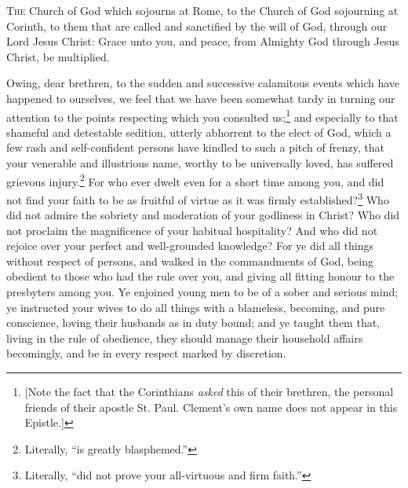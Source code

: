 

\textsc{The} Church of God which sojourns at Rome, to the Church of God sojourning at Corinth, to them that are called and sanctified by the will of God, through our Lord Jesus Christ: Grace unto you, and peace, from Almighty God through Jesus Christ, be multiplied.

Owing, dear brethren, to the sudden and successive calamitous events which have happened to ourselves, we feel that we have been somewhat tardy in turning our attention to the points respecting which you consulted us;\footnote{[Note the fact that the Corinthians \emph{asked} this of their brethren, the personal friends of their apostle St. Paul. Clement’s own name does not appear in this Epistle.]} and especially to that shameful and detestable sedition, utterly abhorrent to the elect of God, which a few rash and self-confident persons have kindled to such a pitch of frenzy, that your venerable and illustrious name, worthy to be universally loved, has suffered grievous injury.\footnote{Literally, “is greatly blasphemed.”} For who ever dwelt even for a short time among you, and did not find your faith to be as fruitful of virtue as it was firmly established?\footnote{Literally, “did not prove your all-virtuous and firm faith.”} Who did not admire the sobriety and moderation of your godliness in Christ? Who did not proclaim the magnificence of your habitual hospitality? And who did not rejoice over your perfect and well-grounded knowledge? For ye did all things without respect of persons, and walked in the commandments of God, being obedient to those who had the rule over you, and giving all fitting honour to the presbyters among you. Ye enjoined young men to be of a sober and serious mind; ye instructed your wives to do all things with a blameless, becoming, and pure conscience, loving their husbands as in duty bound; and ye taught them that, living in the rule of obedience, they should manage their household affairs becomingly, and be in every respect marked by discretion.


